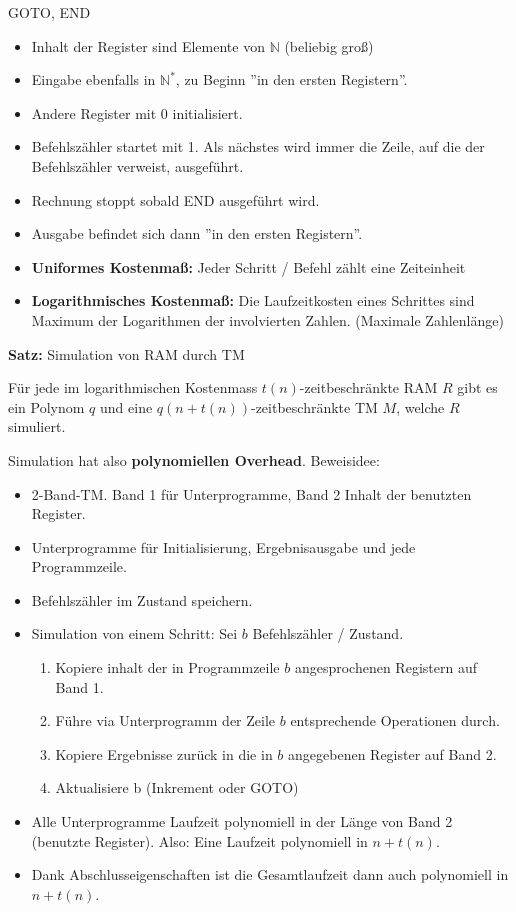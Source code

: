 \documentclass[a4paper,graphics,11pt]{article}
\begin{document}
GOTO, END


\begin{itemize}
    \item Inhalt der Register sind Elemente von $\mathbb{N}$ (beliebig groß)
    \item Eingabe ebenfalls in $\mathbb{N}^*$, zu Beginn ''in den ersten Registern''.
    \item Andere Register mit 0 initialisiert.
    \item Befehlszähler startet mit 1. Als nächstes wird immer die Zeile, auf die der Befehlszähler
        verweist, ausgeführt.
    \item Rechnung stoppt sobald END ausgeführt wird.
    \item Ausgabe befindet sich dann ''in den ersten Registern''.

    \strut

    \item \textbf{Uniformes Kostenmaß:} Jeder Schritt / Befehl zählt eine Zeiteinheit
    \item \textbf{Logarithmisches Kostenmaß:} Die Laufzeitkosten eines Schrittes sind Maximum der
Logarithmen der involvierten Zahlen. (Maximale Zahlenlänge)

\end{itemize}

\newpage

\textbf{Satz:} Simulation von RAM durch TM

Für jede im logarithmischen Kostenmass $t(n)$-zeitbeschränkte RAM $R$ gibt es ein Polynom $q$
und eine $q(n + t(n))$-zeitbeschränkte TM $M$, welche $R$ simuliert.

Simulation hat also \textbf{polynomiellen Overhead}. Beweisidee:
\begin{itemize}
    \item 2-Band-TM. Band 1 für Unterprogramme, Band 2 Inhalt der benutzten Register.
    \item Unterprogramme für Initialisierung, Ergebnisausgabe und jede Programmzeile.
    \item Befehlszähler im Zustand speichern.
    \item Simulation von einem Schritt: Sei $b$ Befehlszähler / Zustand.
        \begin{enumerate}
            \item Kopiere inhalt der in Programmzeile $b$ angesprochenen Registern auf Band 1.
            \item Führe via Unterprogramm der Zeile $b$ entsprechende Operationen durch.
            \item Kopiere Ergebnisse zurück in die in $b$ angegebenen Register auf Band 2.
            \item Aktualisiere b (Inkrement oder GOTO)
        \end{enumerate}
    \item Alle Unterprogramme Laufzeit polynomiell in der Länge von Band 2 (benutzte
        Register). Also: Eine Laufzeit polynomiell in $n + t(n)$.
    \item Dank Abschlusseigenschaften ist die Gesamtlaufzeit dann
        auch polynomiell in $n+ t(n)$.
\end{itemize}
\end{document}
